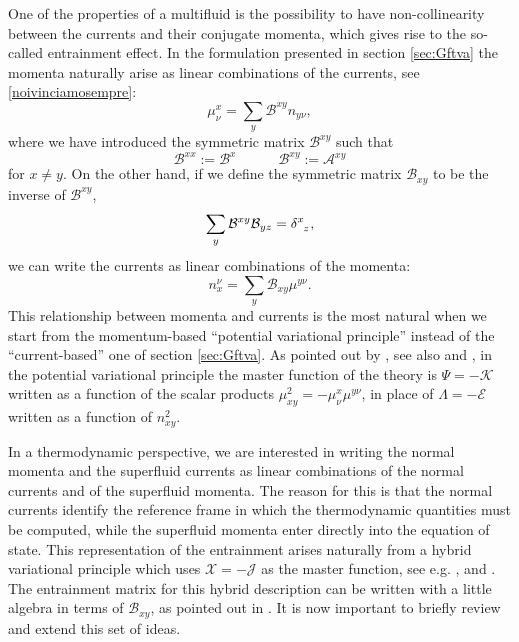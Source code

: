 \documentclass[usenatbib]{mnras}
\newcommand{\spc}{\quad \quad \quad}
\begin{document}
One of the properties of a multifluid is the possibility to have non-collinearity between the currents and their conjugate momenta, which gives rise to the so-called entrainment effect. In the formulation presented in section \ref{sec:Gftva} the momenta naturally arise as linear combinations of the currents, see \eqref{noivinciamosempre}:
%
\begin{equation}\label{entroinentrainmentconte}
\mu_\nu^x = \sum_y \mathcal{B}^{xy} n_{y\nu},
\end{equation}
%
where we have introduced the symmetric matrix $\mathcal{B}^{xy}$ such that
%
\begin{equation}
\mathcal{B}^{xx} := \mathcal{B}^x  \spc  \mathcal{B}^{xy} := \mathcal{A}^{xy}
\end{equation}
%
for $x\neq y$. On the other hand, if we define the symmetric matrix $\mathcal{B}_{xy}$ to be the inverse of $\mathcal{B}^{xy}$,
%
\begin{equation}
\sum_y \mathcal{B}^{xy}\mathcal{B}_{yz} = \delta\indices{^x _z},
\end{equation}
%
we can write the currents as linear combinations of the momenta:
%
\begin{equation}
\label{invertito!!!}
n_x^\nu = \sum_y \mathcal{B}_{xy}\mu^{y\nu}.
\end{equation}
%
This relationship between momenta and currents is the most natural when we start from the momentum-based ``potential variational principle''  instead of the ``current-based'' one of section \ref{sec:Gftva}. 
As pointed out by \cite{CarterKhalat92}, see also  \cite{Prix_single_vortex} and \cite{Schmitt_Instabilities}, in the potential variational principle the master function of the theory is $\Psi = -\mathcal{K}$ written as a function of the scalar products $ \mu_{xy}^2 = -\mu^x_\nu \mu^{y\nu} $, in place of $\Lambda=-\mathcal{E}$ written as a function of $n_{xy}^2$.

In a thermodynamic perspective, we are interested in writing the normal momenta and the superfluid currents as linear combinations of the normal currents and of the superfluid momenta. The reason for this is that the normal currents identify the reference frame in which the thermodynamic quantities must be computed, while the superfluid momenta enter directly into the equation of state. 
This representation of the entrainment arises naturally from a hybrid variational principle which uses $\mathcal{X}=-\mathcal{J}$ as the master function, see e.g. \cite{CarterKhalat92}, \cite{cool1995} and \cite{Dubovsky2012}. 
The entrainment matrix for this hybrid description can be written with a little algebra in terms of $\mathcal{B}_{xy}$, as pointed out in \cite{Prix_single_vortex}. It is now important to briefly review and extend this set of ideas. 
\end{document}
